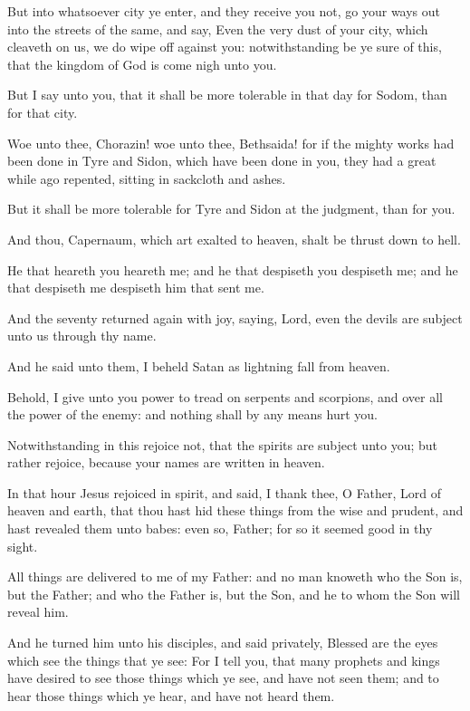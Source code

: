 \verse But into whatsoever city ye enter, and they receive you not, go your ways out into the streets of the same, and say, \verse Even the very dust of your city, which cleaveth on us, we do wipe off against you: notwithstanding be ye sure of this, that the kingdom of God is come nigh unto you.

\verse But I say unto you, that it shall be more tolerable in that day for Sodom, than for that city.

\verse Woe unto thee, Chorazin! woe unto thee, Bethsaida! for if the mighty works had been done in Tyre and Sidon, which have been done in you, they had a great while ago repented, sitting in sackcloth and ashes.

\verse But it shall be more tolerable for Tyre and Sidon at the judgment, than for you.

\verse And thou, Capernaum, which art exalted to heaven, shalt be thrust down to hell.

\verse He that heareth you heareth me; and he that despiseth you despiseth me; and he that despiseth me despiseth him that sent me.

\verse And the seventy returned again with joy, saying, Lord, even the devils are subject unto us through thy name.

\verse And he said unto them, I beheld Satan as lightning fall from heaven.

\verse Behold, I give unto you power to tread on serpents and scorpions, and over all the power of the enemy: and nothing shall by any means hurt you.

\verse Notwithstanding in this rejoice not, that the spirits are subject unto you; but rather rejoice, because your names are written in heaven.

\verse In that hour Jesus rejoiced in spirit, and said, I thank thee, O Father, Lord of heaven and earth, that thou hast hid these things from the wise and prudent, and hast revealed them unto babes: even so, Father; for so it seemed good in thy sight.

\verse All things are delivered to me of my Father: and no man knoweth who the Son is, but the Father; and who the Father is, but the Son, and he to whom the Son will reveal him.

\verse And he turned him unto his disciples, and said privately, Blessed are the eyes which see the things that ye see: \verse For I tell you, that many prophets and kings have desired to see those things which ye see, and have not seen them; and to hear those things which ye hear, and have not heard them.

